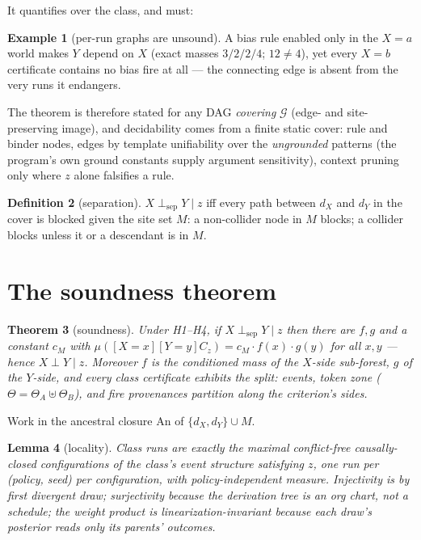\documentclass[11pt]{article}
\newcommand{\Tr}{\Theta}
\newcommand{\dsep}{\perp_{\mathrm{sep}}}
\newcommand{\CI}{\perp}
\newcommand{\An}{\mathrm{An}}
\newtheorem{theorem}{Theorem}[section]
\newtheorem{lemma}[theorem]{Lemma}
\theoremstyle{definition}
\newtheorem{definition}[theorem]{Definition}
\newtheorem{example}[theorem]{Example}
\theoremstyle{remark}
\begin{document}
It quantifies over the class, and must:

\begin{example}[per-run graphs are unsound]
\label{ex:ctx}
A bias rule enabled only in the $X{=}a$ world makes $Y$ depend on $X$
(exact masses $3/2/2/4$; $12\neq4$), yet every $X{=}b$ certificate
contains no bias fire at all --- the connecting edge is absent from
the very runs it endangers.
\end{example}

The theorem is therefore stated for any DAG \emph{covering}
$\mathcal{G}$ (edge- and site-preserving image), and decidability comes
from a finite static cover: rule and binder nodes, edges by
template unifiability over the \emph{ungrounded} patterns (the
program's own ground constants supply argument sensitivity), context
pruning only where $z$ alone falsifies a rule.

\begin{definition}[separation]
$X \dsep Y \mid z$ iff every path between $d_X$ and $d_Y$ in the cover
is blocked given the site set $M$: a non-collider node in $M$ blocks;
a collider blocks unless it or a descendant is in $M$.
\end{definition}

\label{sec:criterion}

\section{The soundness theorem}
\label{sec:soundness}

\begin{theorem}[soundness]
\label{thm:main}
Under H1--H4, if $X \dsep Y \mid z$ then there are $f, g$ and a
constant $c_M$ with
$\mu([X{=}x][Y{=}y]C_z) = c_M\cdot f(x)\cdot g(y)$ for all $x,y$ ---
hence $X \CI Y \mid z$.  Moreover $f$ is the conditioned mass of the
$X$-side sub-forest, $g$ of the $Y$-side, and every class certificate
exhibits the split: events, token zone
($\Tr = \Tr_A \uplus \Tr_B$), and fire provenances partition along
the criterion's sides.
\end{theorem}

Work in the ancestral closure $\An$ of $\{d_X, d_Y\}\cup M$.

\begin{lemma}[locality]
\label{lem:locality}
Class runs are exactly the maximal conflict-free causally-closed
configurations of the class's event structure satisfying $z$, one run
per (policy, seed) per configuration, with policy-independent measure.
Injectivity is by first divergent draw; surjectivity because the
derivation tree is an org chart, not a schedule; the weight product is
linearization-invariant because each draw's posterior reads only its
parents' outcomes.
\end{lemma}
\end{document}
